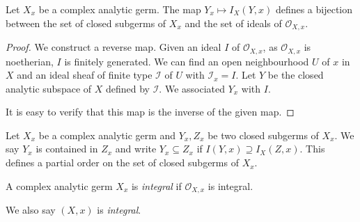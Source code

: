 \begin{proposition}\label{prop-bijsubgermideal}
    Let $X_x$ be a complex analytic germ.
    The map $Y_x\mapsto I_X(Y,x)$ defines a bijection between the set of closed subgerms of $X_x$ and the set of ideals of $\mathcal{O}_{X,x}$.
\end{proposition}
\begin{proof}
    We construct a reverse map. Given an ideal $I$ of $\mathcal{O}_{X,x}$, as $\mathcal{O}_{X,x}$ is noetherian, $I$ is finitely generated. We can find an open neighbourhood $U$ of $x$ in $X$ and an ideal sheaf of finite type $\mathcal{I}$ of $U$ with $\mathcal{I}_x=I$. Let $Y$ be the closed analytic subspace of $X$ defined by $\mathcal{I}$. We associated $Y_x$ with $I$. 
    
    It is easy to verify that this map is the inverse of the given map.
\end{proof}

\begin{definition}
    Let $X_x$ be a complex analytic germ and $Y_x, Z_x$ be two closed subgerms of $X_x$. We say $Y_x$ is contained in $Z_x$ and write
    $Y_x\subseteq Z_x$ if $I(Y,x)\supseteq I_X(Z,x)$. This defines a partial order on the set of closed subgerms of $X_x$.
\end{definition}

\begin{definition}\label{def-integralgerm}
    A complex analytic germ $X_x$ is \emph{integral} if $\mathcal{O}_{X,x}$ is integral.

    We also say $(X,x)$ is \emph{integral}.
\end{definition}

